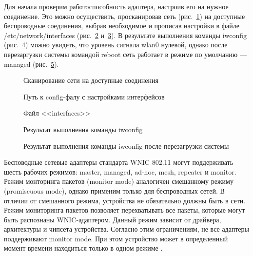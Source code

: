 Для начала проверим работоспособность адаптера, настроив его на нужное соединение. Это можно осуществить, просканировав сеть (рис.~\ref{mm_1:mm_1}) на доступные беспроводные соединения, выбрав необходимое и прописав настройки в файле /etc/network/interfaces (рис.~\ref{mm_2:mm_2} и~\ref{mm_3:mm_3}). В результате выполнения команды iwconfig (рис.~\ref{mm_4:mm_4}) можно увидеть, что уровень сигнала wlan0 нулевой, однако после перезаргузки системы командой reboot сеть работает в режиме по умолчанию --- managed (рис.~\ref{mm_5:mm_5}). 

\begin{figure}[h!]
\center{\texttt{[image: mm\_1]}}
\caption{ Сканирование сети на доступные соединения }
\label{mm_1:mm_1}
\end{figure}


\begin{figure}[h!]
\center{\texttt{[image: mm\_2]}}
\caption{ Путь к config-фалу с настройками интерфейсов }
\label{mm_2:mm_2}
\end{figure}


\begin{figure}[h!]
\center{\texttt{[image: mm\_3]}}
\caption{ Файл <<interfaces>> }
\label{mm_3:mm_3}
\end{figure}

\begin{figure}[h!]
\center{\texttt{[image: mm\_4]}}
\caption{ Результат выполнения команды iwconfig }
\label{mm_4:mm_4}
\end{figure}

\begin{figure}[h!]
\center{\texttt{[image: mm\_5]}}
\caption{ Результат выполнения команды iwconfig после перезагрузки системы }
\label{mm_5:mm_5}
\end{figure}

Бесповодные сетевые адаптеры стандарта WNIC 802.11 могут поддерживать шесть рабочих режимов: master, managed,
ad-hoc, mesh, repeater и monitor. Режим монторинга пакетов (monitor mode) аналогичен смешанному режиму (promiscuous mode), однако применим только для беспроводных сетей. В отличии от смешанного режима, устройства не обязательно должны быть в сети. Режим мониторинга пакетов позволяет перехватывать все пакеты, которые могут быть распознаны WNIC-адаптером. Данный режим зависит от драйвера, архитектуры и чипсета устройства. Согласно этим ограничениям, не все адаптеры поддерживают monitor mode. При этом устройство может в определенный момент времени находиться только в одном режиме \cite{article}.

